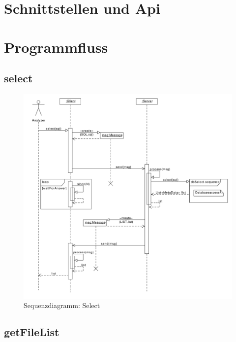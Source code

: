 \newpage

\section{Schnittstellen und Api}

\section{Programmfluss}

\subsection {select}

\begin{figure}[h]
	\centering
	\label{design:dia:sqc:select}
	\includegraphics[width=\textwidth]{design/frontend/sequence/select-sequence.pdf}
	\caption{Sequenzdiagramm: Select}
\end{figure}

\subsection {getFileList}

